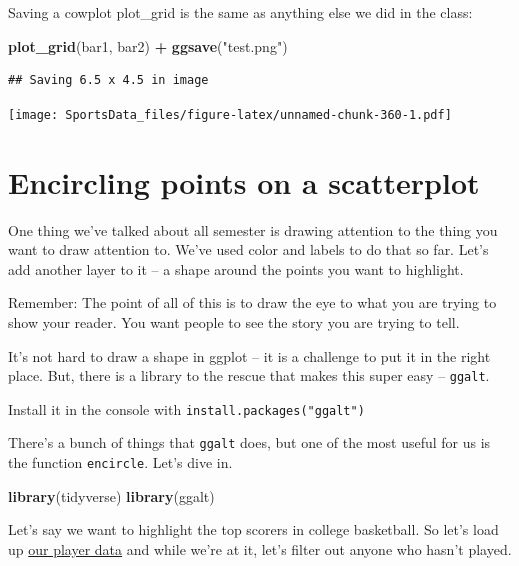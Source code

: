 \documentclass[
]{book}
\newenvironment{Shaded}{\begin{snugshade}}{\end{snugshade}}
\newcommand{\KeywordTok}[1]{\textcolor[rgb]{0.13,0.29,0.53}{\textbf{#1}}}
\newcommand{\NormalTok}[1]{#1}
\newcommand{\OperatorTok}[1]{\textcolor[rgb]{0.81,0.36,0.00}{\textbf{#1}}}
\newcommand{\StringTok}[1]{\textcolor[rgb]{0.31,0.60,0.02}{#1}}
\begin{document}
Saving a cowplot plot\_grid is the same as anything else we did in the class:

\begin{Shaded}
\begin{Highlighting}[]
\KeywordTok{plot_grid}\NormalTok{(bar1, bar2) }\OperatorTok{+}\StringTok{ }\KeywordTok{ggsave}\NormalTok{(}\StringTok{"test.png"}\NormalTok{)}
\end{Highlighting}
\end{Shaded}

\begin{verbatim}
## Saving 6.5 x 4.5 in image
\end{verbatim}

\texttt{[image: SportsData\_files/figure-latex/unnamed-chunk-360-1.pdf]}

\hypertarget{encircling-points-on-a-scatterplot}{%
\chapter{Encircling points on a scatterplot}\label{encircling-points-on-a-scatterplot}}

One thing we've talked about all semester is drawing attention to the thing you want to draw attention to. We've used color and labels to do that so far. Let's add another layer to it -- a shape around the points you want to highlight.

Remember: The point of all of this is to draw the eye to what you are trying to show your reader. You want people to see the story you are trying to tell.

It's not hard to draw a shape in ggplot -- it is a challenge to put it in the right place. But, there is a library to the rescue that makes this super easy -- \texttt{ggalt}.

Install it in the console with \texttt{install.packages("ggalt")}

There's a bunch of things that \texttt{ggalt} does, but one of the most useful for us is the function \texttt{encircle}. Let's dive in.

\begin{Shaded}
\begin{Highlighting}[]
\KeywordTok{library}\NormalTok{(tidyverse)}
\KeywordTok{library}\NormalTok{(ggalt)}
\end{Highlighting}
\end{Shaded}

Let's say we want to highlight the top scorers in college basketball. So let's load up \href{https://unl.box.com/s/0g56ve61y6hakyxzr1u4t534721bqvg8}{our player data} and while we're at it, let's filter out anyone who hasn't played.
\end{document}
